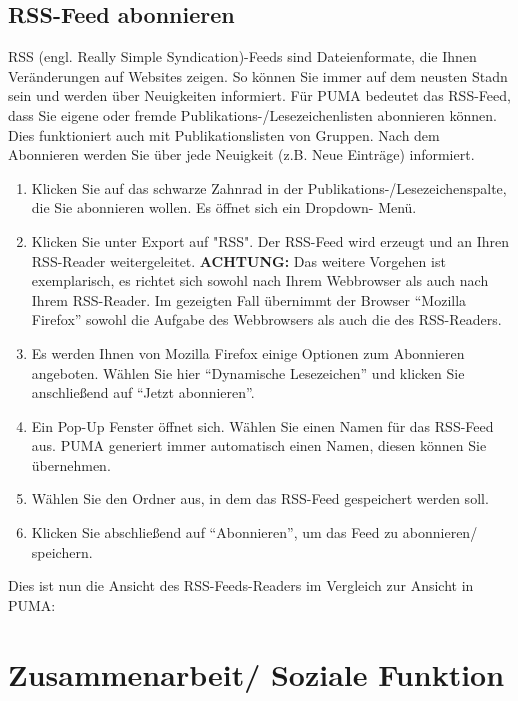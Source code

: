 \documentclass[a4paper,11pt,twoside]{scrbook}
\begin{document}
\subsection{RSS-Feed abonnieren}
RSS (engl. Really Simple Syndication)-Feeds sind Dateienformate, die Ihnen Veränderungen auf Websites zeigen. So können Sie immer auf dem neusten Stadn sein und werden über Neuigkeiten informiert. Für PUMA bedeutet das RSS-Feed, dass Sie eigene oder fremde Publikations-/Lesezeichenlisten abonnieren können. Dies funktioniert auch mit Publikationslisten von Gruppen. Nach dem Abonnieren werden Sie über jede Neuigkeit (z.B. Neue Einträge) informiert. %
\begin{enumerate}
    \item Klicken Sie auf das schwarze Zahnrad in der Publikations-/Lesezeichenspalte, die Sie abonnieren wollen. Es öffnet sich ein Dropdown- Menü.
    \item  Klicken Sie unter Export auf "RSS". Der RSS-Feed wird erzeugt und an Ihren RSS-Reader weitergeleitet. 
\newline 
\textbf{ACHTUNG:} Das weitere Vorgehen ist exemplarisch, es richtet sich sowohl nach Ihrem Webbrowser als auch nach Ihrem RSS-Reader. Im gezeigten Fall übernimmt der Browser \enquote{Mozilla Firefox} sowohl die Aufgabe des Webbrowsers als auch die des RSS-Readers.
    \item Es werden Ihnen von Mozilla Firefox einige Optionen zum Abonnieren angeboten. Wählen Sie hier \enquote{Dynamische Lesezeichen} und klicken Sie anschließend auf \enquote{Jetzt abonnieren}.
    \item Ein Pop-Up Fenster öffnet sich. Wählen Sie einen Namen für das RSS-Feed aus. PUMA generiert immer automatisch einen Namen, diesen können Sie übernehmen.
    \item Wählen Sie den Ordner aus, in dem das RSS-Feed gespeichert werden soll.
    \item Klicken Sie abschließend auf \enquote{Abonnieren}, um das Feed zu abonnieren/ speichern.
\end{enumerate}
Dies ist nun die Ansicht des RSS-Feeds-Readers im Vergleich zur Ansicht in PUMA:


\newpage
\section{Zusammenarbeit/ Soziale Funktion}
\end{document}
